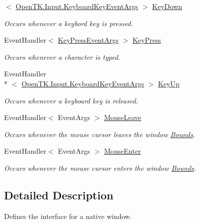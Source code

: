 \begin{DoxyCompactItemize}
$<$ \hyperlink{class_open_t_k_1_1_input_1_1_keyboard_key_event_args}{Open\-T\-K.\-Input.\-Keyboard\-Key\-Event\-Args} $>$ \hyperlink{interface_open_t_k_1_1_i_native_window_a85cebd106b9852b2c6566ef026b55962}{Key\-Down}
\begin{DoxyCompactList}\small\item\em Occurs whenever a keybord key is pressed. \end{DoxyCompactList}\item 
Event\-Handler$<$ \hyperlink{class_open_t_k_1_1_key_press_event_args}{Key\-Press\-Event\-Args} $>$ \hyperlink{interface_open_t_k_1_1_i_native_window_ade20fbd09d4d714240faa4ca4617cf3f}{Key\-Press}
\begin{DoxyCompactList}\small\item\em Occurs whenever a character is typed. \end{DoxyCompactList}\item 
Event\-Handler\\*
$<$ \hyperlink{class_open_t_k_1_1_input_1_1_keyboard_key_event_args}{Open\-T\-K.\-Input.\-Keyboard\-Key\-Event\-Args} $>$ \hyperlink{interface_open_t_k_1_1_i_native_window_ab835df3fcdda59e03027d1f2b200d8b8}{Key\-Up}
\begin{DoxyCompactList}\small\item\em Occurs whenever a keyboard key is released. \end{DoxyCompactList}\item 
Event\-Handler$<$ Event\-Args $>$ \hyperlink{interface_open_t_k_1_1_i_native_window_a217050d279f6678319ab32bccba0de40}{Mouse\-Leave}
\begin{DoxyCompactList}\small\item\em Occurs whenever the mouse cursor leaves the window \hyperlink{interface_open_t_k_1_1_i_native_window_a0cf4d0391cff1166a3f15fbdb1b4d8ab}{Bounds}. \end{DoxyCompactList}\item 
Event\-Handler$<$ Event\-Args $>$ \hyperlink{interface_open_t_k_1_1_i_native_window_a4334f6f15abee869953af0845bd4dd41}{Mouse\-Enter}
\begin{DoxyCompactList}\small\item\em Occurs whenever the mouse cursor enters the window \hyperlink{interface_open_t_k_1_1_i_native_window_a0cf4d0391cff1166a3f15fbdb1b4d8ab}{Bounds}. \end{DoxyCompactList}\end{DoxyCompactItemize}


\subsection{Detailed Description}
Defines the interface for a native window. 



